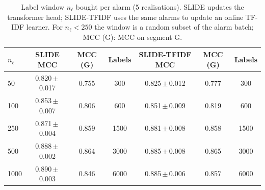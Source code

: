 \begin{table}[t]
\centering
\caption{Label window $n_\ell$ bought per alarm (5 realisations). SLIDE updates the transformer head; SLIDE-TFIDF uses the same alarms to update an online TF-IDF learner. For $n_\ell<250$ the window is a random subset of the alarm batch; MCC (G): MCC on segment G.}
\label{tab:rev-budget}
\scriptsize
\setlength{\tabcolsep}{3pt}
\begin{tabular}{@{}lcccccc@{}}
\toprule
$n_\ell$ & SLIDE MCC & MCC (G) & Labels & SLIDE-TFIDF MCC & MCC (G) & Labels \\
\midrule
50 & 0.820\,$\pm$\,0.017 & 0.755 & 300 & 0.825\,$\pm$\,0.012 & 0.777 & 300 \\
100 & 0.853\,$\pm$\,0.007 & 0.806 & 600 & 0.851\,$\pm$\,0.009 & 0.819 & 600 \\
250 & 0.871\,$\pm$\,0.004 & 0.859 & 1500 & 0.881\,$\pm$\,0.008 & 0.858 & 1500 \\
500 & 0.888\,$\pm$\,0.002 & 0.864 & 3000 & 0.885\,$\pm$\,0.008 & 0.865 & 3000 \\
1000 & 0.890\,$\pm$\,0.003 & 0.846 & 6000 & 0.885\,$\pm$\,0.006 & 0.857 & 6000 \\
\bottomrule
\end{tabular}
\end{table}
